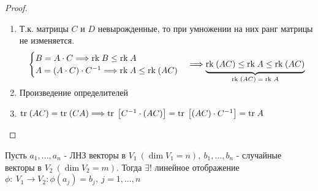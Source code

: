     \begin{proof} \tab 
        \begin{enumerate}
            \item Т.к. матрицы $C$ и $D$ невырожденные, то при умножении на них ранг матрицы не изменяется.
            $$\begin{cases}
                B = A \cdot C \Longrightarrow \text{rk} \hspace{0.09cm} B \leq \text{rk} \hspace{0.09cm} A\\
                A = (A \cdot C) \cdot C^{-1} \Longrightarrow \text{rk} \hspace{0.09cm} A \leq \text{rk} \hspace{0.09cm} (AC)
            \end{cases} \Longrightarrow \undermat{\text{rk} \hspace{0.09cm} (AC) = \text{rk} \hspace{0.09cm} A}{\text{rk} \hspace{0.09cm} (AC)\leq \text{rk} \hspace{0.09cm} A \leq \text{rk} \hspace{0.09cm} (AC)}$$
            \item Произведение определителей
            \item $\text{tr} \hspace{0.09cm} (AC) = \text{tr} \hspace{0.09cm}(CA) \Longrightarrow \text{tr} \hspace{0.09cm}\left[C^{-1} \cdot (AC)\right] = \text{tr} \hspace{0.09cm}\left[(AC)\cdot C^{-1}\right] = \text{tr} \hspace{0.09cm}A$    
        \end{enumerate}
    \end{proof}  
    \begin{theorem}
        Пусть $a_1,...,a_n$ - ЛНЗ векторы в $V_1 \ (\dim V_1 = n), \ b_1,...,b_n$ - случайные векторы в $V_2\ (\dim V_2 = m)$. Тогда $\exists !$ линейное отображение $\phi: \ V_1 \to V_2: \phi(a_j) = b_j, \ j = 1,...,n$     
    \end{theorem}
